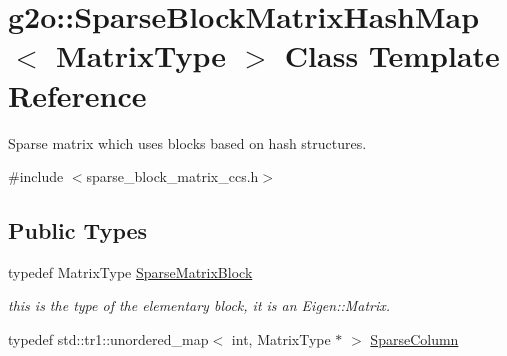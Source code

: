 \hypertarget{classg2o_1_1_sparse_block_matrix_hash_map}{}\section{g2o\+:\+:Sparse\+Block\+Matrix\+Hash\+Map$<$ Matrix\+Type $>$ Class Template Reference}
\label{classg2o_1_1_sparse_block_matrix_hash_map}


Sparse matrix which uses blocks based on hash structures.  




{\ttfamily \#include $<$sparse\+\_\+block\+\_\+matrix\+\_\+ccs.\+h$>$}

\subsection*{Public Types}
\begin{DoxyCompactItemize}
\item 
typedef Matrix\+Type \mbox{\hyperlink{classg2o_1_1_sparse_block_matrix_hash_map_a03d422844dbf0b10f4fcf7e69fdb0bca}{Sparse\+Matrix\+Block}}
\begin{DoxyCompactList}\small\item\em this is the type of the elementary block, it is an Eigen\+::\+Matrix. \end{DoxyCompactList}\item 
typedef std\+::tr1\+::unordered\+\_\+map$<$ int, Matrix\+Type $\ast$ $>$ \mbox{\hyperlink{classg2o_1_1_sparse_block_matrix_hash_map_ae364a722296b90e32dd6c3a8fbeb49ae}{Sparse\+Column}}
\end{DoxyCompactItemize}

